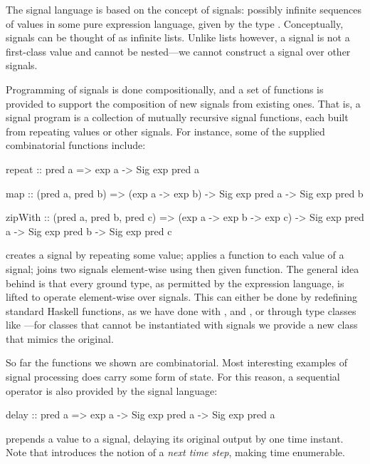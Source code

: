 \documentclass[../paper.tex]{subfiles}
\begin{document}

The signal language is based on the concept of signals: possibly infinite sequences of values in some pure expression language, given by the type . Conceptually, signals can be thought of as infinite lists. Unlike lists however, a signal is not a first-class value and cannot be nested---we cannot construct a signal over other signals.

Programming of signals is done compositionally, and a set of functions is provided to support the composition of new signals from existing ones. That is, a signal program is a collection of mutually recursive signal functions, each built from repeating values or other signals. For instance, some of the supplied combinatorial functions include:

\begin{code}
repeat :: pred a => exp a -> Sig exp pred a

map :: (pred a, pred b) => (exp a -> exp b)
  -> Sig exp pred a -> Sig exp pred b

zipWith :: (pred a, pred b, pred c) => (exp a -> exp b -> exp c)
  -> Sig exp pred a -> Sig exp pred b -> Sig exp pred c
\end{code}

\noindent {} creates a signal by repeating some value;  applies a function to each value of a signal;  joins two signals element-wise using then given function. The general idea behind is that every ground type, as permitted by the expression language, is lifted to operate element-wise over signals. This can either be done by redefining standard Haskell functions, as we have done with ,  and , or through type classes like ---for classes that cannot be instantiated with signals we provide a new class that mimics the original.

So far the functions we shown are combinatorial. Most interesting examples of signal processing does carry some form of state. For this reason, a sequential operator is also provided by the signal language:

\begin{code}
delay :: pred a => exp a -> Sig exp pred a -> Sig exp pred a
\end{code}

\noindent {} prepends a value to a signal, delaying its original output by one time instant. Note that  introduces the notion of a \emph{next time step}, making time enumerable.
\end{document}
